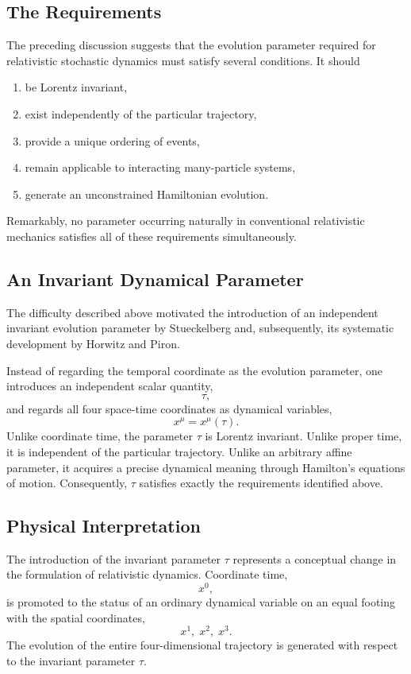 \subsection{The Requirements}
The preceding discussion suggests that the evolution parameter required
for relativistic stochastic dynamics must satisfy several conditions.
It should
\begin{enumerate}
\item be Lorentz invariant,
\item exist independently of the particular trajectory,
\item provide a unique ordering of events,
\item remain applicable to interacting many-particle systems,
\item generate an unconstrained Hamiltonian evolution.
\end{enumerate}
Remarkably, no parameter occurring naturally in conventional
relativistic mechanics satisfies all of these requirements
simultaneously.
\subsection{An Invariant Dynamical Parameter}
The difficulty described above motivated the introduction of an
independent invariant evolution parameter by Stueckelberg and,
subsequently, its systematic development by Horwitz and Piron.

Instead of regarding the temporal coordinate as the evolution
parameter, one introduces an independent scalar quantity,
\[\tau,\]
and regards all four space-time coordinates as dynamical variables,
\[x^\mu=x^\mu(\tau).\]
Unlike coordinate time, the parameter \(\tau\) is Lorentz invariant.
Unlike proper time, it is independent of the particular trajectory.
Unlike an arbitrary affine parameter, it acquires a precise dynamical
meaning through Hamilton's equations of motion.
Consequently, \(\tau\) satisfies exactly the requirements identified
above.
\subsection{Physical Interpretation}
The introduction of the invariant parameter \(\tau\) represents a
conceptual change in the formulation of relativistic dynamics.
Coordinate time,
\[x^0,\]
is promoted to the status of an ordinary dynamical variable on an equal
footing with the spatial coordinates,
\[x^1,\;x^2,\;x^3.\]
The evolution of the entire four-dimensional trajectory is generated
with respect to the invariant parameter \(\tau\).

